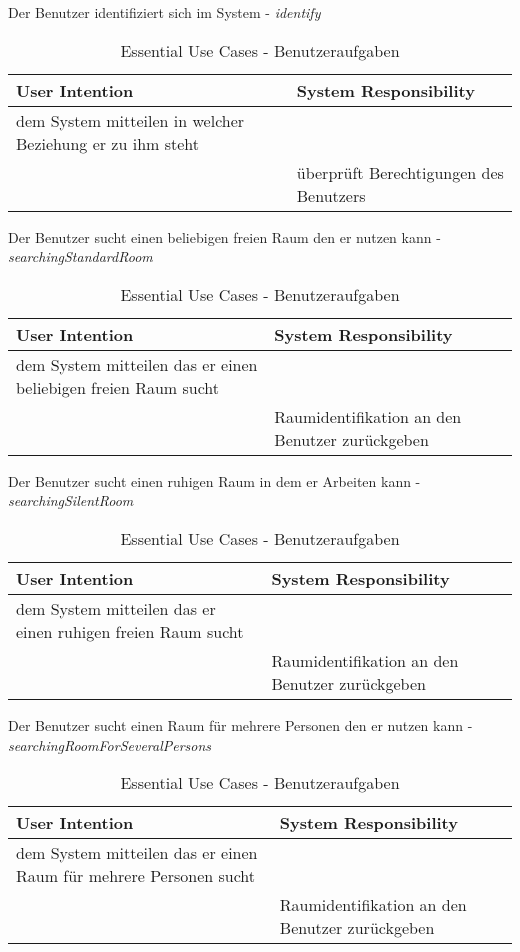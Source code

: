 \begin{table}[h]
	\caption{Essential Use Cases - Benutzeraufgaben}
	
	Der Benutzer identifiziert sich im System - \textit{identify}\\
	\begin{tabularx}{\textwidth}{|X|X|}
	\rowcolor{heading} \textbf{User Intention} & \textbf{System Responsibility}\\ \hline
	dem System mitteilen in welcher Beziehung er zu ihm steht & \\
	 & überprüft Berechtigungen des Benutzers \\ \hline
	\end{tabularx}

	Der Benutzer sucht einen beliebigen freien Raum den er nutzen kann - \textit{searchingStandardRoom}\\
	\begin{tabularx}{\textwidth}{|X|X|}
	\rowcolor{heading} \textbf{User Intention} & \textbf{System Responsibility}\\ \hline
	dem System mitteilen das er einen beliebigen freien Raum sucht & \\
	 & Raumidentifikation an den Benutzer zurückgeben \\ \hline
	\end{tabularx}

	Der Benutzer sucht einen ruhigen Raum in dem er Arbeiten kann - \textit{searchingSilentRoom}\\
	\begin{tabularx}{\textwidth}{|X|X|}
	\rowcolor{heading} \textbf{User Intention} & \textbf{System Responsibility}\\ \hline
	dem System mitteilen das er einen ruhigen freien Raum sucht & \\
	 & Raumidentifikation an den Benutzer zurückgeben \\ \hline
	\end{tabularx}
	
	Der Benutzer sucht einen Raum für mehrere Personen den er nutzen kann - \textit{searchingRoomForSeveralPersons}\\
	\begin{tabularx}{\textwidth}{|X|X|}
	\rowcolor{heading} \textbf{User Intention} & \textbf{System Responsibility}\\ \hline
	dem System mitteilen das er einen Raum für mehrere Personen sucht & \\
	 & Raumidentifikation an den Benutzer zurückgeben \\ \hline
	\end{tabularx}
	

\end{table}
